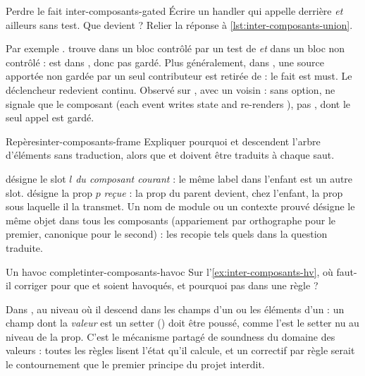 \begin{exercice}{Perdre le fait }{inter-composants-gated}
Écrire un handler  qui appelle  derrière 
\emph{et} ailleurs sans test. Que devient  ? Relier la réponse à
\cref{lst:inter-composants-union}.
\end{exercice}
\begin{solution}
Par exemple
.
 trouve  dans un bloc contrôlé par un test de 
\emph{et} dans un bloc non contrôlé :  est dans , donc pas gardé. Plus
généralement, dans , une source apportée non gardée par un seul contributeur
est retirée de  : le fait est must. Le déclencheur redevient continu. Observé sur
, avec un  voisin : sans option,
 ne signale que le composant  (\og each 
event writes state  and re-renders \fg), pas , dont le seul
appel est gardé.
\end{solution}

\begin{exercice}{Repères}{inter-composants-frame}
Expliquer pourquoi  et  descendent l'arbre d'éléments sans
traduction, alors que  et  doivent être traduits à chaque saut.
\end{exercice}
\begin{solution}
 désigne le slot $l$ \emph{du composant courant} : le même label dans l'enfant est un
autre slot.  désigne la prop $p$ \emph{reçue} : la prop  du parent
devient, chez l'enfant, la prop sous laquelle il la transmet. Un nom de module ou un contexte
prouvé désigne le même objet dans tous les composants (appariement par orthographe pour le
premier,  canonique pour le second) :  les recopie tels quels dans la
question traduite.
\end{solution}

\begin{exercice}{Un havoc complet}{inter-composants-havoc}
Sur l'\cref{ex:inter-composants-hv}, où faut-il corriger pour que  et  soient
havoqués, et pourquoi pas dans une règle ?
\end{exercice}
\begin{solution}
Dans , au niveau où il descend dans les champs d'un
 ou les éléments d'un  : un champ dont la \emph{valeur} est un
setter () doit être poussé, comme l'est le setter nu au niveau de la prop.
C'est le mécanisme partagé de soundness du domaine des valeurs : toutes les règles lisent l'état
qu'il calcule, et un correctif par règle serait le contournement que le premier principe du
projet interdit.
\end{solution}

